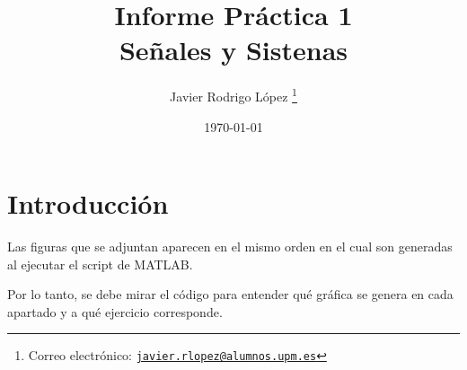 \documentclass{article}
\title{\Huge Informe Práctica 1\\\vspace*{5pt}
\Large Señales y Sistenas}
\author{Javier Rodrigo López \thanks{Correo electrónico: \href{mailto:javier.rlopez@alumnos.upm.es}{\texttt{javier.rlopez@alumnos.upm.es}}}}
\date{\today}
\begin{document}
\maketitle

\tableofcontents
\setlength{\cftparskip}{0.5\baselineskip}
\listoffigures

\newpage

\section{Introducción}
Las figuras que se adjuntan aparecen en el mismo orden en el cual son generadas al ejecutar el script de MATLAB.

Por lo tanto, se debe mirar el código para entender qué gráfica se genera en cada apartado y a qué ejercicio corresponde.

\newpage
\end{document}

